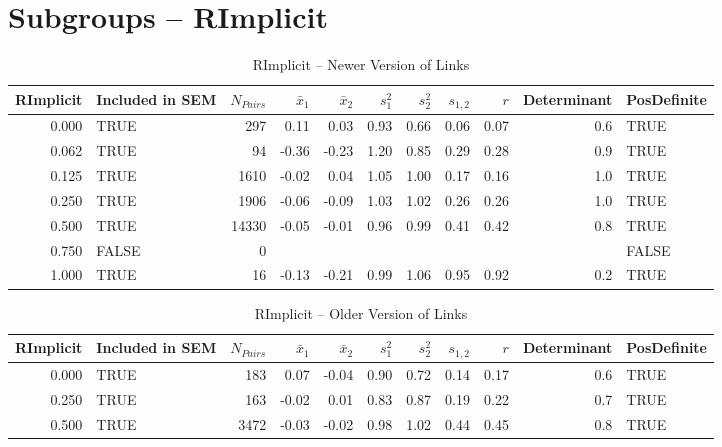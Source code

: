 \documentclass{article}\usepackage[]{graphicx}\usepackage[]{color}
\begin{document}
\section{Subgroups --  RImplicit }%
\begin{table}[ht]
\centering
\begin{tabular}{rlrrrrrrrrl}
  \hline
RImplicit & Included in SEM & $N_{Pairs}$ & $\bar{x}_1$ & $\bar{x}_2$ & $s_1^2$ & $s_2^2$ & $s_{1,2}$ & $r$ & Determinant & PosDefinite \\ 
  \hline
0.000 & TRUE & 297 & 0.11 & 0.03 & 0.93 & 0.66 & 0.06 & 0.07 & 0.6 & TRUE \\ 
  0.062 & TRUE & 94 & -0.36 & -0.23 & 1.20 & 0.85 & 0.29 & 0.28 & 0.9 & TRUE \\ 
  0.125 & TRUE & 1610 & -0.02 & 0.04 & 1.05 & 1.00 & 0.17 & 0.16 & 1.0 & TRUE \\ 
  0.250 & TRUE & 1906 & -0.06 & -0.09 & 1.03 & 1.02 & 0.26 & 0.26 & 1.0 & TRUE \\ 
  0.500 & TRUE & 14330 & -0.05 & -0.01 & 0.96 & 0.99 & 0.41 & 0.42 & 0.8 & TRUE \\ 
  0.750 & FALSE & 0 &  &  &  &  &  &  &  & FALSE \\ 
  1.000 & TRUE & 16 & -0.13 & -0.21 & 0.99 & 1.06 & 0.95 & 0.92 & 0.2 & TRUE \\ 
   \hline
\end{tabular}
\caption{RImplicit -- Newer Version of Links} 
\end{table}
\begin{table}[ht]
\centering
\begin{tabular}{rlrrrrrrrrl}
  \hline
RImplicit & Included in SEM & $N_{Pairs}$ & $\bar{x}_1$ & $\bar{x}_2$ & $s_1^2$ & $s_2^2$ & $s_{1,2}$ & $r$ & Determinant & PosDefinite \\ 
  \hline
0.000 & TRUE & 183 & 0.07 & -0.04 & 0.90 & 0.72 & 0.14 & 0.17 & 0.6 & TRUE \\ 
  0.250 & TRUE & 163 & -0.02 & 0.01 & 0.83 & 0.87 & 0.19 & 0.22 & 0.7 & TRUE \\ 
  0.500 & TRUE & 3472 & -0.03 & -0.02 & 0.98 & 1.02 & 0.44 & 0.45 & 0.8 & TRUE \\ 
   \hline
\end{tabular}
\caption{RImplicit -- Older Version of Links} 
\end{table}
\end{document}
